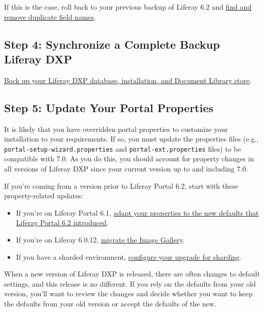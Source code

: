 If this is the case, roll back to your previous backup of Liferay 6.2
and
\href{/docs/6-2/deploy/-/knowledge_base/d/upgrading-liferay\#find-and-remove-duplicate-field-names}{find
and remove duplicate field names}.

\subsection{Step 4: Synchronize a Complete Backup Liferay
DXP}\label{step-4-synchronize-a-complete-backup-liferay-dxp}

\href{/docs/7-0/deploy/-/knowledge_base/d/backing-up-a-liferay-installation}{Back
up your Liferay DXP database, installation, and Document Library store}.

\subsection{Step 5: Update Your Portal
Properties}\label{step-5-update-your-portal-properties}

It is likely that you have overridden portal properties to customize
your installation to your requirements. If so, you must update the
properties files (e.g., \texttt{portal-setup-wizard.properties} and
\texttt{portal-ext.properties} files) to be compatible with 7.0. As you
do this, you should account for property changes in all versions of
Liferay DXP since your current version up to and including 7.0.

If you're coming from a version prior to Liferay Portal 6.2, start with
these property-related updates:

\begin{itemize}
\item
  If you're on Liferay Portal 6.1,
  \href{/docs/6-2/deploy/-/knowledge_base/d/upgrading-liferay\#review-the-liferay-6}{adapt
  your properties to the new defaults that Liferay Portal 6.2
  introduced}.
\item
  If you're on Liferay 6.0.12,
  \href{/docs/6-2/deploy/-/knowledge_base/d/upgrading-liferay\#migrate-your-image-gallery-images}{migrate
  the Image Gallery}.
\item
  If you have a sharded environment,
  \href{/docs/7-0/deploy/-/knowledge_base/d/upgrading-sharded-environment}{configure
  your upgrade for sharding}.
\end{itemize}

When a new version of Liferay DXP is released, there are often changes
to default settings, and this release is no different. If you rely on
the defaults from your old version, you'll want to review the changes
and decide whether you want to keep the defaults from your old version
or accept the defaults of the new.

